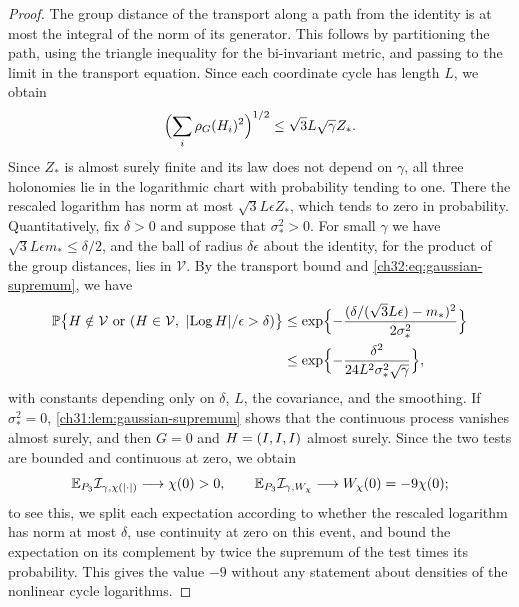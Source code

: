 \begin{proof}
The group distance of the transport along a path from the identity is at most the integral of the norm of its generator. This follows by partitioning the path, using the triangle inequality for the bi-invariant metric, and passing to the limit in the transport equation. Since each coordinate cycle has length $L$, we obtain
\[
 \Bigl(\sum_i\rho_G(H_i)^2\Bigr)^{1/2}\le\sqrt3L\sqrt\gamma Z_*.
\]
Since $Z_*$ is almost surely finite and its law does not depend on $\gamma$, all three holonomies lie in the logarithmic chart with probability tending to one. There the rescaled logarithm has norm at most $\sqrt3L\epsilon Z_*$, which tends to zero in probability. Quantitatively, fix $\delta>0$ and suppose that $\sigma_*^2>0$. For small $\gamma$ we have $\sqrt3L\epsilon m_*\le\delta/2$, and the ball of radius $\delta\epsilon$ about the identity, for the product of the group distances, lies in $\mathcal V$. By the transport bound and \eqref{ch32:eq:gaussian-supremum}, we have
\begin{equation}\label{ch32:eq:gaussian-core-tail}
 \begin{split}
 \mathbb P\bigl\{H\notin\mathcal V\text{ or }(H\in\mathcal V,\ \lvert \operatorname{Log} H\rvert/\epsilon>\delta)\bigr\}
 &\le\exp\Bigl\{-\frac{(\delta/(\sqrt3L\epsilon)-m_*)^2}{2\sigma_*^2}\Bigr\}\\
 &\le\exp\Bigl\{-\frac{\delta^2}{24L^2\sigma_*^2\sqrt\gamma}\Bigr\},
 \end{split}
\end{equation}
with constants depending only on $\delta$, $L$, the covariance, and the smoothing. If $\sigma_*^2=0$, \cref{ch31:lem:gaussian-supremum} shows that the continuous process vanishes almost surely, and then $G=0$ and $H=(I,I,I)$ almost surely. Since the two tests are bounded and continuous at zero, we obtain
\[
 \mathbb E_{P_3}\mathcal I_{\gamma,\chi(\lvert \cdot\rvert)}\longrightarrow\chi(0)>0,\qquad\mathbb E_{P_3}\mathcal I_{\gamma,W_\chi}\longrightarrow W_\chi(0)=-9\chi(0);
\]
to see this, we split each expectation according to whether the rescaled logarithm has norm at most $\delta$, use continuity at zero on this event, and bound the expectation on its complement by twice the supremum of the test times its probability. This gives the value $-9$ without any statement about densities of the nonlinear cycle logarithms.


\end{proof}
